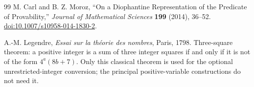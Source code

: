 \documentclass[11pt,a4paper]{article}
\theoremstyle{remark}
\begin{document}
\begin{thebibliography}{99}
M. Carl and B. Z. Moroz, ``On a Diophantine Representation
of the Predicate of Provability,'' \emph{Journal of Mathematical
Sciences} \textbf{199} (2014), 36--52.
\href{https://doi.org/10.1007/s10958-014-1830-2}{doi:10.1007/s10958-014-1830-2}.

A.-M. Legendre, \emph{Essai sur la th\'eorie des nombres}, Paris,
1798. Three-square theorem: a positive integer is a sum of three
integer squares if and only if it is not of the form $4^a(8b+7)$.
Only this classical theorem is used for the optional unrestricted-integer
conversion; the principal positive-variable constructions do not need it.
\end{thebibliography}
\endgroup
\end{document}
